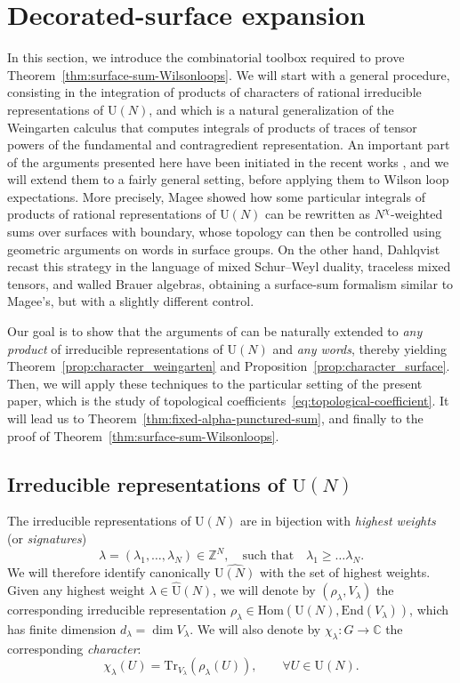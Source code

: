 \documentclass[11pt,a4paper,reqno]{article}
\theoremstyle{definition}
\theoremstyle{remark}
\newcommand\U{{\mathrm U}}
\newcommand\Z{{\mathbb Z}}
\newcommand\C{\mathbb{C}}
\newcommand\Tr{\mathrm{Tr}}
\newcommand\Hom{\mathrm{Hom}}
\newcommand\End{{\mathrm{End}}}
\begin{document}
\section{Decorated-surface expansion}\label{sec:surface-sum}

In this section, we introduce the combinatorial toolbox required to prove Theorem~\ref{thm:surface-sum-Wilsonloops}. We will start with a general procedure, consisting in the integration of products of characters of rational irreducible representations of $\U(N)$, and which is a natural generalization of the Weingarten calculus that computes integrals of products of traces of tensor powers of the fundamental and contragredient representation. An important part of the arguments presented here have been initiated in the recent works \cite{Mag,Mag2,Dah26}, and we will extend them to a fairly general setting, before applying them to Wilson loop expectations. More precisely, Magee showed how some particular integrals of products of rational representations of $\U(N)$ can be rewritten as $N^\chi$-weighted sums over surfaces with boundary, whose topology can then be controlled using geometric arguments on words in surface groups. On the other hand, Dahlqvist recast this strategy in the language of mixed Schur--Weyl duality, traceless mixed tensors, and walled Brauer algebras, obtaining a surface-sum formalism similar to Magee's, but with a slightly different control.

Our goal is to show that the arguments of \cite{Mag2,Dah26} can be naturally extended to \emph{any product} of irreducible representations of $\U(N)$ and \emph{any words}, thereby yielding Theorem~\ref{prop:character_weingarten} and Proposition~\ref{prop:character_surface}. Then, we will apply these techniques to the particular setting of the present paper, which is the study of topological coefficients~\eqref{eq:topological-coefficient}. It will lead us to Theorem~\ref{thm:fixed-alpha-punctured-sum}, and finally to the proof of Theorem~\ref{thm:surface-sum-Wilsonloops}.

\subsection{Irreducible representations of $\mathrm{U}(N)$}

The irreducible representations of $\U(N)$ are in bijection with \emph{highest weights} (or \emph{signatures})
\[
\lambda=(\lambda_1,\ldots,\lambda_N)\in\Z^N,\quad \text{such that}\quad \lambda_1\geq\ldots\lambda_N.
\]
We will therefore identify canonically $\widehat{\U(N)}$ with the set of highest weights. Given any highest weight $\lambda\in\widehat{\U}(N)$, we will denote by $(\rho_\lambda,V_\lambda)$ the corresponding irreducible representation $\rho_\lambda\in\Hom(\U(N),\End(V_\lambda))$, which has finite dimension $d_\lambda=\dim V_\lambda$. We will also denote by $\chi_\lambda:G\to\C$ the corresponding \emph{character}:
\begin{equation}
\chi_\lambda(U)=\Tr_{V_\lambda}(\rho_\lambda(U)),\qquad \forall U\in\U(N).
\end{equation}
\end{document}
